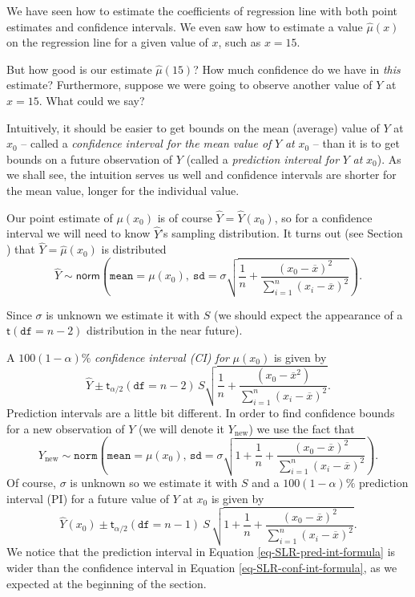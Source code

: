 We have seen how to estimate the coefficients of regression line with
both point estimates and confidence intervals. We even saw how to
estimate a value \(\hat{\mu}(x)\) on the regression line for a given
value of \(x\), such as \(x=15\).

But how good is our estimate \(\hat{\mu}(15)\)? How much confidence do
we have in \emph{this} estimate? Furthermore, suppose we were going to
observe another value of \(Y\) at \(x=15\). What could we say?

Intuitively, it should be easier to get bounds on the mean (average)
value of \(Y\) at \(x_{0}\) -- called a \emph{confidence interval for the
mean value of} \(Y\) \emph{at} \(x_{0}\) -- than it is to get bounds on a
future observation of \(Y\) (called a \emph{prediction interval for} \(Y\)
\emph{at} \(x_{0}\)). As we shall see, the intuition serves us well and
confidence intervals are shorter for the mean value, longer for the
individual value.

Our point estimate of \(\mu(x_{0})\) is of course
\(\hat{Y}=\hat{Y}(x_{0})\), so for a confidence interval we will need
to know \(\hat{Y}\)'s sampling distribution. It turns out (see Section
) that \(\hat{Y}=\hat{\mu}(x_{0})\) is distributed
\begin{equation}
\hat{Y}\sim\mathsf{norm}\left(\mathtt{mean}=\mu(x_{0}),\:\mathtt{sd}=\sigma\sqrt{\frac{1}{n}+\frac{(x_{0}-\overline{x})^{2}}{\sum_{i=1}^{n}(x_{i}-\overline{x})^{2}}}\right).
\end{equation}

Since \(\sigma\) is unknown we estimate it with \(S\) (we should
expect the appearance of a \(\mathsf{t}(\mathtt{df}=n-2)\)
distribution in the near future).

A \( 100(1-\alpha)\% \) \emph{confidence interval (CI) for} \(\mu(x_{0})\)
is given by
\begin{equation}
\label{eq-SLR-conf-int-formula}
\hat{Y}\pm\mathsf{t}_{\alpha/2}(\mathtt{df}=n-2)\, S\sqrt{\frac{1}{n}+\frac{(x_{0}-\overline{x}^{2})}{\sum_{i=1}^{n}(x_{i}-\overline{x})^{2}}}.
\end{equation}
Prediction intervals are a little bit different. In order to find
confidence bounds for a new observation of \(Y\) (we will denote it
\(Y_{\mbox{new}}\)) we use the fact that
\begin{equation}
Y_{\mbox{new}}\sim\mathtt{norm}\left(\mathtt{mean}=\mu(x_{0}),\,\mathtt{sd}=\sigma\sqrt{1+\frac{1}{n}+\frac{(x_{0}-\overline{x})^{2}}{\sum_{i=1}^{n}(x_{i}-\overline{x})^{2}}}\right).
\end{equation}
Of course, \(\sigma\) is unknown so we estimate it with \(S\) and a \(
100(1-\alpha)\% \) prediction interval (PI) for a future value of
\(Y\) at \(x_{0}\) is given by
\begin{equation}
\label{eq-SLR-pred-int-formula}
\hat{Y}(x_{0})\pm\mathsf{t}_{\alpha/2}(\mathtt{df}=n-1)\: S\,\sqrt{1+\frac{1}{n}+\frac{(x_{0}-\overline{x})^{2}}{\sum_{i=1}^{n}(x_{i}-\overline{x})^{2}}}.
\end{equation}
We notice that the prediction interval in Equation
\eqref{eq-SLR-pred-int-formula} is wider than the confidence interval
in Equation \eqref{eq-SLR-conf-int-formula}, as we expected at the
beginning of the section.

